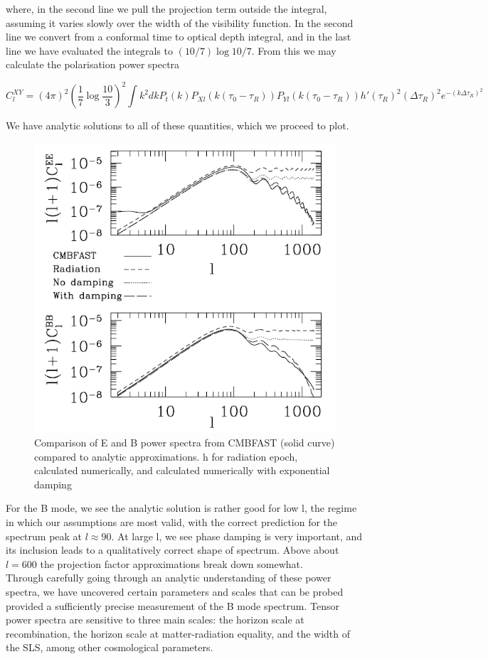 \documentclass[a4paper,10pt]{article}
\begin{document}
where, in the second line we pull the projection term outside the integral, assuming it varies slowly over the width of the visibility function. In the second line we convert from a conformal time to optical depth integral, and in the last line we have evaluated the integrals to $(10/7)\log{10/7}$. From this we may calculate the polarisation power spectra

\begin{equation}
C_l^{XY} = (4\pi)^2 (\frac{1}{7}\log{\frac{10}{3}})^2 \int k^2dk P_t(k) P_{Xl}(k(\tau_0-\tau_R))P_{Yl}(k(\tau_0-\tau_R))h'(\tau_R)^2(\Delta\tau_R)^2e^{-(k\Delta\tau_R)^2}
\end{equation}

We have analytic solutions to all of these quantities, which we proceed to plot.



\begin{figure}[h]
  \includegraphics[width=0.5\linewidth]{analytic.png}
  \centering
  \caption{Comparison of E and B power spectra from CMBFAST (solid curve) compared to analytic approximations. h for radiation epoch, calculated numerically, and calculated numerically  with exponential damping}
\end{figure}



For the B mode, we see the analytic solution is rather good for low l, the regime in which our assumptions are most valid, with the correct prediction for the spectrum peak at $l\approx 90$. At large l, we see phase damping is very important, and its inclusion leads to a qualitatively correct shape of spectrum. Above about $l=600$ the projection factor approximations break down somewhat. \\

Through carefully going through an analytic understanding of these power spectra, we have uncovered certain parameters and scales that can be probed provided a sufficiently precise measurement of the B mode spectrum. Tensor power spectra are sensitive to three main scales: the horizon scale at recombination,  the horizon scale at matter-radiation equality, and the width of the SLS, among other cosmological parameters.\\
\end{document}
